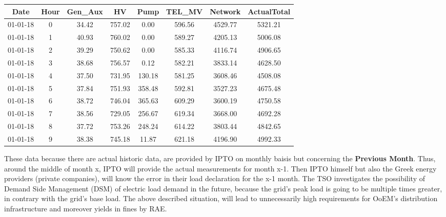 \begin{table}[h!]
\centering
\begin{tabular}{|c|c|c|c|c|c|c|c|}
\hline
\textbf{Date} & \textbf{Hour} & \textbf{Gen\_Aux} & \textbf{HV} & \textbf{Pump} & \textbf{TEL\_MV} & \textbf{Network} & \textbf{ActualTotal} \\ \hline
01-01-18      & 0             & 34.42             & 757.02      & 0.00          & 596.56           & 4529.77          & 5321.21              \\ \hline
01-01-18      & 1             & 40.93             & 760.02      & 0.00          & 589.27           & 4205.13          & 5006.08              \\ \hline
01-01-18      & 2             & 39.29             & 750.62      & 0.00          & 585.33           & 4116.74          & 4906.65              \\ \hline
01-01-18      & 3             & 38.68             & 756.57      & 0.12          & 582.21           & 3833.14          & 4628.50              \\ \hline
01-01-18      & 4             & 37.50             & 731.95      & 130.18        & 581.25           & 3608.46          & 4508.08              \\ \hline
01-01-18      & 5             & 37.84             & 751.93      & 358.48        & 592.81           & 3527.23          & 4675.48              \\ \hline
01-01-18      & 6             & 38.72             & 746.04      & 365.63        & 609.29           & 3600.19          & 4750.58              \\ \hline
01-01-18      & 7             & 38.56             & 729.05      & 256.67        & 619.34           & 3668.00          & 4692.28              \\ \hline
01-01-18      & 8             & 37.72             & 753.26      & 248.24        & 614.22           & 3803.44          & 4842.65              \\ \hline
01-01-18      & 9             & 38.38             & 745.18      & 11.87         & 621.18           & 4196.90          & 4992.33              \\ \hline
\end{tabular}
\end{table}
These data because there are actual historic data, are provided by IPTO on monthly baisis but concerning the \textbf{Previous Month}. Thus, around the middle of month x, IPTO will provide the actual measurements for month x-1. Then IPTO himself but also the Greek energy providers (private companies), will know the error in their load declaration for the x-1 month. The TSO investigates the possibility of Demand Side Management (DSM) of electric load demand in the future, because the grid's peak load is going to be multiple times greater, in contrary with the grid's base load. The above described situation, will lead to unnecessarily high requirements for OoEM's distribution infrastructure and moreover yields in fines by RAE.
